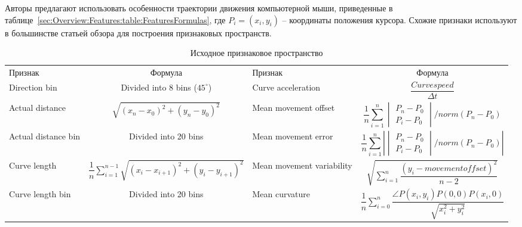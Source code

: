 \documentclass[12pt]{article}
\begin{document}
    \par Авторы \cite{Mondal} предлагают использовать особенности траектории движения компьютерной мыши, приведенные в таблице~\ref{sec:Overview:Features:table:FeaturesFormulas}, где $P_i = (x_i, y_i)$ -- координаты положения курсора. Схожие признаки используют в большинстве статьей обзора для построения признаковых пространств.

    \begin{table}[h]
        \centering
        \footnotesize
        \renewcommand{\arraystretch}{1.5}
        \renewcommand{\tabcolsep}{1mm}
        \caption{Исходное признаковое пространство}
        \begin{tabular}[c]{ || m{20mm} | c || m{20mm} | c ||}
            \hhline{|t:==:t:==:t|}
            Признак & Формула &  Признак &  Формула \\ [2mm]
            \hhline{|:==::==:|}
            Direction bin & \centering Divided into 8 bins ($45^{\circ}$) &
            Curve acceleration & {\centering $ \dfrac{Curvespeed}{\Delta t} $} \\
            \hhline{||-|-||-|-||}
            Actual distance & $ \sqrt{(x_n-x_0)^2 + (y_n-y_0)^2} $ &
            Mean movement offset & \begin{equation*} \dfrac{1}{n} \sum_{i=1}^{n} \begin{vmatrix} P_n - P_0 \\ P_i - P_0 \end{vmatrix} / norm(P_n - P_0) \end{equation*} \\
            \hhline{||-|-||-|-||}
            Actual distance bin & {\centering Divided into 20 bins} &
            Mean movement error & {\centering \begin{equation*} \dfrac{1}{n} \sum_{i=1}^{n} \left| \begin{vmatrix} P_n - P_0 \\ P_i - P_0  \end{vmatrix} / norm(P_n - P_0) \right| \end{equation*}} \\
            \hhline{||-|-||-|-||}
            Curve length & {\centering $ \dfrac{1}{n} \sum\limits_{i=1}^{n-1} \sqrt{(x_i-x_{i+1})^2 + (y_i-y_{i+1})^2} $} &
            Mean movement variability & {\centering $ \sqrt{\sum\limits_{i=1}^{n} \dfrac{(y_i - movementoffset)^2}{n-2}} $} \\
            \hhline{||-|-||-|-||}
            Curve length bin & {\centering Divided into 20 bins} &
            Mean curvature & {\centering $ \dfrac{1}{n} \sum\limits_{i=0}^{n} \dfrac{\angle P(x_i, y_i)P(0,0)P(x_i, 0)}{\sqrt{x_{i}^2 + y_{i}^2}} $} \\

\end{tabular}
\end{table}
\end{document}
